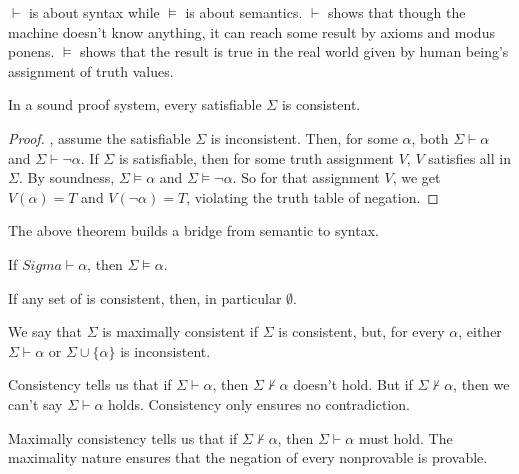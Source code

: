 $\vdash$ is about syntax while $\vDash$ is about semantics. $\vdash$ shows that though the machine doesn't know anything, it can reach some result by axioms and modus ponens. $\vDash$ shows that the result is true in the real world given by human being's assignment of truth values.

\begin{theorem}
In a sound proof system, every satisfiable $\Sigma$ is consistent. 
\end{theorem}

\begin{proof}
\bwoc, assume the satisfiable $\Sigma$ is inconsistent. Then, for some $\alpha$, both $\Sigma\vdash\alpha$ and $\Sigma\vdash\neg\alpha$. 
If $\Sigma$ is satisfiable, then for some truth assignment $V$, $V$ satisfies all \wff in $\Sigma$. By soundness, $\Sigma\vDash\alpha$ and $\Sigma\vDash\neg\alpha$. So for that assignment $V$, we get $V(\alpha)=T$ and $V(\neg\alpha)=T$, violating the truth table of negation.
\end{proof}

The above theorem builds a bridge from semantic to syntax.

\begin{theorem}
If $Sigma\vdash\alpha$, then $\Sigma\vDash\alpha$.
\end{theorem}

\begin{corollary}
If any set of \wff is consistent, then, in particular $\emptyset$.
\end{corollary}


\begin{definition}
We say that $\Sigma$ is maximally consistent if $\Sigma$ is consistent, but, for every $\alpha$, either $\Sigma\vdash\alpha$ or $\Sigma\cup\{\alpha\}$ is inconsistent.
\end{definition}

\begin{mdframed}
Consistency tells us that if $\Sigma\vdash\alpha$, then $\Sigma\nvdash\alpha$ doesn't hold. But if $\Sigma\nvdash\alpha$, then we can't say $\Sigma\vdash\alpha$ holds. Consistency only ensures no contradiction.

Maximally consistency tells us that if $\Sigma\nvdash\alpha$, then $\Sigma\vdash\alpha$ must hold. The maximality nature ensures that the negation of every nonprovable \wff is provable.
\end{mdframed}

